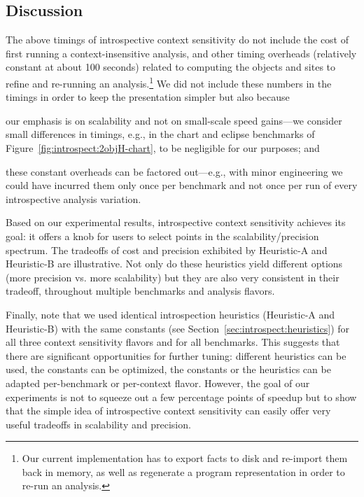 \subsection{Discussion}
The above timings of introspective context sensitivity do not include the cost of first running a context-insensitive analysis, and other timing overheads (relatively constant at about 100 seconds) related to computing the objects and sites to refine and re-running an analysis.\footnote{Our current implementation has to export facts to disk and re-import them back in memory, as well as regenerate a program representation in order to re-run an analysis.} We did not include these numbers in the timings in order to keep the presentation simpler but also because
\begin{inparaenum}[(a)]
\item our emphasis is on scalability and not on small-scale speed gains---we consider small differences in timings, e.g., in the chart and eclipse benchmarks of Figure~\ref{fig:introspect:2objH-chart}, to be negligible for our purposes; and
\item these constant overheads can be factored out---e.g., with minor engineering we could have incurred them only once per benchmark and not once per run of every introspective analysis variation.
\end{inparaenum}

Based on our experimental results, introspective context sensitivity achieves its goal: it offers a knob for users to select points in the scalability/precision spectrum. The tradeoffs of cost and precision exhibited by Heuristic-A and Heuristic-B are illustrative. Not only do these heuristics yield different options (more precision vs. more scalability) but they are also very consistent in their tradeoff, throughout multiple benchmarks and analysis flavors.

Finally, note that we used identical introspection heuristics (Heuristic-A and Heuristic-B) with the same constants (see Section~\ref{sec:introspect:heuristics}) for all three context sensitivity flavors and for all benchmarks. This suggests that there are significant opportunities for further tuning: different heuristics can be used, the constants can be optimized, the constants or the heuristics can be adapted per-benchmark or per-context flavor. However, the goal of our experiments is not to squeeze out a few percentage points of speedup but to show that the simple idea of introspective context sensitivity can easily offer very useful tradeoffs in scalability and precision.


